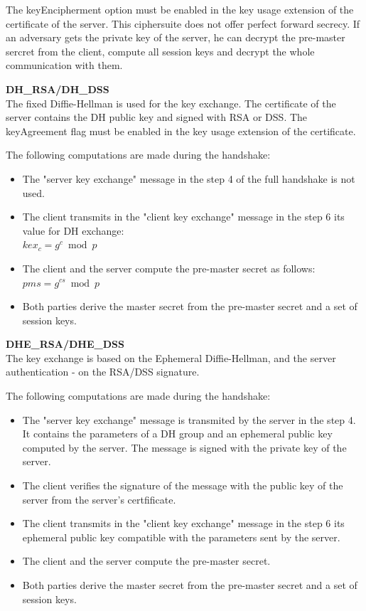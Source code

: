 The keyEncipherment option must be enabled in the key usage extension of the certificate of the server.
This ciphersuite does not offer perfect forward secrecy. If an adversary gets the private key of the server, he can decrypt the pre-master sercret from the client, compute all session keys and decrypt the whole communication with them.

\textbf{DH\_RSA/DH\_DSS} \\
The fixed Diffie-Hellman is used for the key exchange. The certificate of the server contains the DH public key and signed with RSA or DSS.
The keyAgreement flag must be enabled in the key usage extension of the certificate.

The following computations are made during the handshake:
\begin{itemize}
	\item The "server key exchange" message in the step 4 of the full handshake is not used.
	\item The client transmits in the "client key exchange" message in the step 6 its value for DH exchange: \\ $\displaystyle kex_c = g^c \bmod p $ 
	\item The client and the server compute the pre-master secret as follows: $\displaystyle pms = g^{cs} \bmod p$
	\item Both parties derive the master secret from the pre-master secret and a set of session keys.
\end{itemize}

\textbf{DHE\_RSA/DHE\_DSS} \\
The key exchange is based on the Ephemeral Diffie-Hellman, and the server authentication - on the RSA/DSS signature.

The following computations are made during the handshake:
\begin{itemize}
	\item The "server key exchange" message is transmited by the server in the step 4. It contains the parameters of a DH group and an ephemeral public key computed by the server. The message is signed with the private key of the server.
	\item The client verifies the signature of the message with the public key of the server from the server's certfificate.
	\item The client transmits in the "client key exchange" message in the step 6 its ephemeral public key compatible with the parameters sent by the server.
	\item The client and the server compute the pre-master secret.
	\item Both parties derive the master secret from the pre-master secret and a set of session keys.
\end{itemize}

